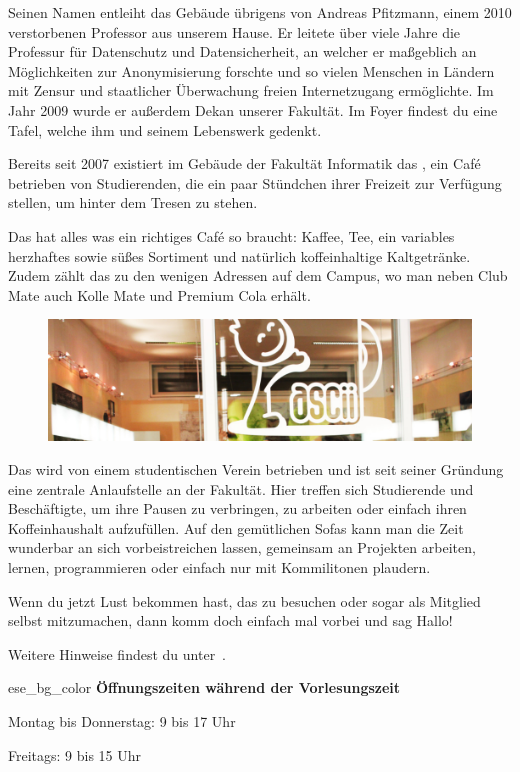 Seinen Namen entleiht das Gebäude übrigens von Andreas Pfitzmann, einem 2010 verstorbenen Professor aus unserem Hause.
Er leitete über viele Jahre die Professur für Datenschutz und Datensicherheit, an welcher er maßgeblich an Möglichkeiten zur Anonymisierung forschte und so vielen Menschen in Ländern mit Zensur und staatlicher Überwachung freien Internetzugang ermöglichte. Im Jahr 2009 wurde er außerdem Dekan unserer Fakultät.
Im Foyer findest du eine Tafel, welche ihm und seinem Lebenswerk gedenkt.

\pagebreak


Bereits seit 2007 existiert im Gebäude der Fakultät Informatik das \ascii{}, ein Café betrieben von Studierenden, die ein paar Stündchen ihrer Freizeit zur Verfügung stellen, um hinter dem Tresen zu stehen.

Das \ascii{} hat alles was ein richtiges Café so braucht: Kaffee, Tee, ein variables herzhaftes sowie süßes Sortiment und natürlich koffeinhaltige Kaltgetränke.
Zudem zählt das \ascii{} zu den wenigen Adressen auf dem Campus, wo man neben Club Mate auch Kolle Mate und Premium Cola erhält.

\begin{figure}[h!]
    \centering
    \includegraphics[width=\linewidth]{img/ascii.jpg}
\end{figure}

Das \ascii{} wird von einem studentischen Verein betrieben und ist seit seiner Gründung eine zentrale Anlaufstelle an der Fakultät.
Hier treffen sich Studierende und Beschäftigte, um ihre Pausen zu verbringen, zu arbeiten oder einfach ihren Koffeinhaushalt aufzufüllen.
Auf den gemütlichen Sofas kann man die Zeit wunderbar an sich vorbeistreichen lassen, gemeinsam an Projekten arbeiten, lernen, programmieren oder einfach nur mit Kommilitonen plaudern.

Wenn du jetzt Lust bekommen hast, das \ascii{} zu besuchen oder sogar als Mitglied selbst mitzumachen, dann komm doch einfach mal vorbei und sag Hallo!

Weitere Hinweise findest du unter~.

\begin{awesomeblock}{2pt}{\faCalendar*[regular]}{ese_bg_color}
    \textbf{Öffnungszeiten während der Vorlesungszeit}

    Montag bis Donnerstag: 9 bis 17 Uhr

    Freitags: 9 bis 15 Uhr
\end{awesomeblock}
